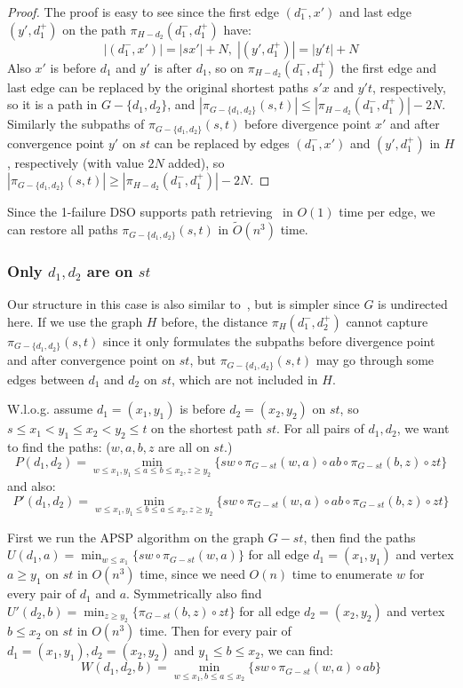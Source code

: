 \documentclass[11pt]{article}
\theoremstyle{plain}
\theoremstyle{definition}
\newcommand{\set}[1]{\{ #1 \}}
\newcommand{\og}[3]{\pi_{G-#3}\left(#1,#2\right)}
\newcommand{\hg}[3]{\pi_{H-#3}\left(#1,#2\right)}
\begin{document}
\begin{proof}
The proof is easy to see since the first edge $(d_1^-,x')$ and last edge $(y',d_1^+)$ on the path $\hg{d_1^-}{d_1^+}{d_2}$ have:
$$|(d_1^-,x')|=|sx'|+N, \; |(y',d_1^+)|=|y't|+N$$
Also $x'$ is before $d_1$ and $y'$ is after $d_1$, so on $\hg{d_1^-}{d_1^+}{d_2}$ the first edge and last edge can be replaced by the original shortest paths $s'x$ and $y't$, respectively, so it is a path in $G-\{d_1,d_2\}$, and $|\og{s}{t}{\set{d_1, d_2}}| \leq |\hg{d_1^-}{d_1^+}{d_2}| - 2N$. Similarly the subpaths of $\og{s}{t}{\set{d_1, d_2}}$ before divergence point $x'$ and after convergence point $y'$ on $st$ can be replaced by edges $(d_1^-,x')$ and $(y',d_1^+)$ in $H$, respectively (with value $2N$ added), so $|\og{s}{t}{\set{d_1, d_2}}| \geq |\hg{d_1^-}{d_1^+}{d_2}| - 2N$.
\end{proof}
Since the 1-failure DSO supports path retrieving~\cite{Demetrescu2008, 2009A} in $O(1)$ time per edge, we can restore all paths $\og{s}{t}{\set{d_1, d_2}}$ in $\tilde{O}(n^3)$ time.


\subsubsection{Only $d_1,d_2$ are on $st$}\label{sec:two-2FRP}

Our structure in this case is also similar to~\cite{WWX22}, but is simpler since $G$ is undirected here. If we use the graph $H$ before, the distance $\pi_H(d_1^-,d_2^+)$ cannot capture $\og{s}{t}{\set{d_1, d_2}}$ since it only formulates the subpaths before divergence point and after convergence point on $st$, but $\og{s}{t}{\set{d_1, d_2}}$ may go through some edges between $d_1$ and $d_2$ on $st$, which are not included in $H$. 

W.l.o.g. assume $d_1=(x_1,y_1)$ is before $d_2=(x_2,y_2)$ on $st$, so $s\leq x_1<y_1\leq x_2<y_2\leq t$ on the shortest path $st$. For all pairs of $d_1,d_2$, we want to find the paths: ($w,a,b,z$ are all on $st$.)
$$P(d_1,d_2)=\min_{w\leq x_1, y_1\leq a\leq b\leq x_2, z\geq y_2} \{sw\circ \pi_{G-st}(w,a)\circ ab\circ \pi_{G-st}(b,z)\circ zt\}$$
and also:
$$P'(d_1,d_2)=\min_{w\leq x_1, y_1\leq b\leq a\leq x_2, z\geq y_2} \{sw\circ \pi_{G-st}(w,a)\circ ab\circ \pi_{G-st}(b,z)\circ zt\}$$

First we run the APSP algorithm on the graph $G-st$, then find the paths $U(d_1,a)=\min_{w\leq x_1}\{sw\circ \pi_{G-st}(w,a)\}$ for all edge $d_1=(x_1,y_1)$ and vertex $a\geq y_1$ on $st$ in $O(n^3)$ time, since we need $O(n)$ time to enumerate $w$ for every pair of $d_1$ and $a$. Symmetrically also find $U'(d_2,b)=\min_{z\geq y_2}\{\pi_{G-st}(b,z)\circ zt\}$ for all edge $d_2=(x_2,y_2)$ and vertex $b\leq x_2$ on $st$ in $O(n^3)$ time. Then for every pair of $d_1=(x_1,y_1),d_2=(x_2,y_2)$ and $y_1\leq b\leq x_2$, we can find:
$$W(d_1,d_2,b)=\min_{w\leq x_1, b\leq a\leq x_2} \{sw\circ \pi_{G-st}(w,a)\circ ab\}$$
\end{document}
